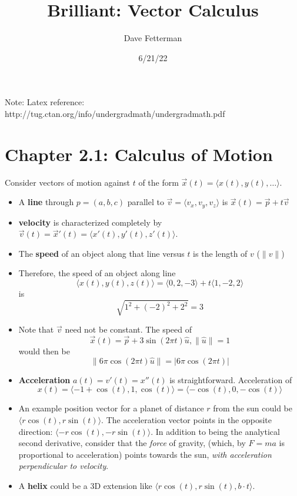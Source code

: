 \documentclass[11pt, oneside]{article}   	%
\title{Brilliant: Vector Calculus}
\author{Dave Fetterman}
\date{6/21/22}							%
\begin{document}
\maketitle
Note: Latex reference: http://tug.ctan.org/info/undergradmath/undergradmath.pdf
\section{Chapter 2.1: Calculus of Motion}

Consider vectors of motion against $t$ of the form $ \vec{x}(t) = \langle x(t), y(t), \ldots \rangle$.
\begin{itemize}
\item A \textbf{line} through $p = (a, b, c)$ parallel to $\vec{v} = \langle v_x, v_y, v_z\rangle$ is $\vec{x}(t) = \vec{p} + t \vec{v}$ 
\item \textbf{velocity} is characterized completely by $\vec{v}(t) = \vec{x}'(t) = \langle x'(t), y'(t), z'(t)\rangle$.
\item The \textbf{speed} of an object along that line versus $t$ is the length of $v$ ($\|v\|$)  
\item Therefore, the speed of an object along line 
$$ \langle x(t), y(t), z(t)\rangle = \langle 0, 2, -3\rangle + t\langle 1,-2,2\rangle$$ is $$\sqrt{1^2+(-2)^2 + 2^2} = 3$$
\item Note that $\vec{v}$ need not be constant.  The speed of $$\vec{x}(t) =  \vec{p} + 3 \sin(2\pi t)\hat{u}, \| \hat{u} \| = 1$$ would then be $$\| 6\pi \cos(2 \pi t) \hat{u} \| = |6\pi \cos(2 \pi t)|$$
\item \textbf{Acceleration} $a(t) = v'(t) = x''(t)$ is straightforward.  Acceleration of $$x(t) = \langle -1 + \cos(t), 1, \cos(t)\rangle = \langle -\cos(t), 0, -\cos(t)\rangle$$
\item An example position vector for a planet of distance $r$ from the sun could be $\langle r \cos(t), r \sin(t) \rangle$.  The acceleration vector points in the opposite direction: $\langle - r \cos(t), - r \sin(t) \rangle$.  In addition to being the analytical second derivative, consider that the \emph{force} of gravity, (which, by $F = ma$ is proportional to acceleration) points towards the sun, \emph{with acceleration perpendicular to velocity}.

\item A \textbf{helix} could be a 3D extension like $\langle r \cos(t), r \sin(t), b\cdot t \rangle$.  
\end{itemize}
\end{document}
